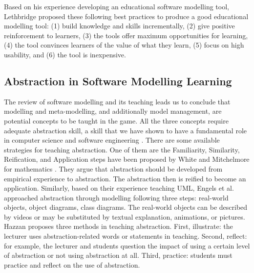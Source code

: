 \documentclass[12pt, a4paper]{report}
\begin{document}
{Based on his experience developing an educational software modelling tool, Lethbridge \cite{lethbridge2014teaching} proposed these following best practices to produce  a good educational modelling tool: (1) build knowledge and skills incrementally, (2) give positive reinforcement to learners, (3) the tools offer maximum opportunities for learning, (4) the tool convinces learners of the value of what they learn, (5) focus on high usability, and (6) the tool is inexpensive.

\subsection{Abstraction in Software Modelling Learning}
\label{Abstraction in Software Modelling Learning}
The review of software modelling and its teaching leads us to conclude that modelling and meta-modelling, and additionally model management, are potential concepts to be taught in the game. All the three concepts require adequate abstraction skill, a skill that we have shown to have a fundamental role in computer science and software engineering \cite{engels2005teaching, Kramer2007, hazzan2008reflections}. There are some available strategies for teaching abstraction. One of them are the Familiarity, Similarity, Reification, and Application steps have been proposed by White and Mitchelmore for mathematics \cite{white2010teaching}. They argue that abstraction should be developed from empirical experience to abstraction. The abstraction then is reified to become an application. Similarly, based on their experience teaching UML, Engels et al. \cite{engels2005teaching} approached abstraction through modelling following three steps: real-world objects, object diagrams, class diagrams. The real-world objects can be described by videos or may be substituted by textual explanation, animations, or pictures. Hazzan \cite{hazzan2008reflections} proposes three methods in teaching abstraction. First, illustrate: the lecturer uses abstraction-related words or statements in teaching. Second, reflect: for example, the lecturer and students question the impact of using a certain level of abstraction or not using abstraction at all. Third, practice: students must practice and reflect on the use of abstraction. 

}
\end{document}

